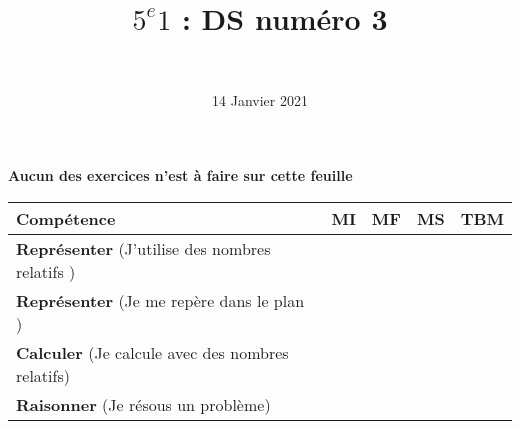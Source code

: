 \documentclass[a4paper,11pt]{exam}
\author{\ }
\date{14 Janvier 2021}
\title{$5^e 1$ : DS num\'ero 3}
\begin{document}
%	

	\maketitle
%	
\begin{center}
	\textbf{Aucun des exercices n'est à faire sur cette feuille}
\end{center}

\begin{small}
	\begin{center}
		\begin{tabular}{|@{\ }l@{\ }|@{\ }c@{\ }|@{\ }c@{\ }|@{\ }c@{\ }|@{\ }c@{\ }|}
			\hline
			\textbf{Compétence} & \textbf{MI} & \textbf{MF} & \textbf{MS} & \textbf{TBM} \\
			\hline
			\textbf{Représenter} (J'utilise des nombres relatifs ) &  \ \ & \ \ & \ \ & \ \  \\
			\hline
			\textbf{Représenter} (Je me repère dans le plan ) &  \ \ & \ \ & \ \ & \ \  \\
			\hline
			\textbf{Calculer} (Je calcule avec des nombres relatifs)&  \ \ & \ \ & \ \ & \ \  \\
			\hline	
			\textbf{Raisonner} (Je résous un problème) & \ \ & \ \ &  \ \  & \ \ \\
			\hline
%			 
		\end{tabular}
	\end{center}
\end{small}	

	
	




\newpage





%



%

\label{LastPage}

%
\end{document}
